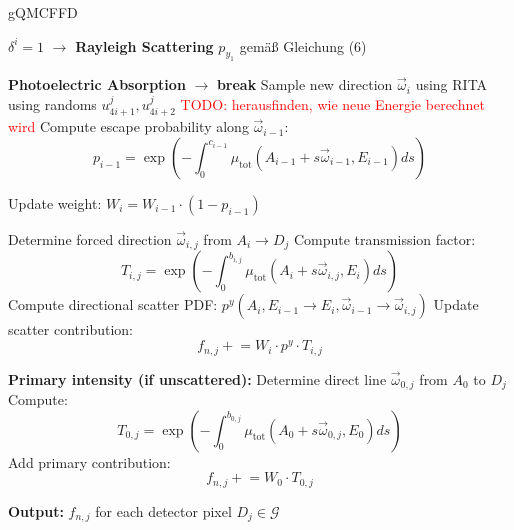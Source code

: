 \begin{algorithm}{gQMCFFD}
\begin{algorithmic}[1]
        
        \State $\delta^i=1$ $\to$ \textbf{Rayleigh Scattering} \State
        $p_{y_1}$ gemäß Gleichung (6)

        \Else 
            \State \textbf{Photoelectric Absorption} $\to$ \textbf{break}
    \EndIf
    \State Sample new direction $\vec{\omega}_i$ using RITA using randoms $u^j_{4i+1}, u^j_{4i+2}$
    \State \textcolor{red}{TODO: herausfinden, wie neue Energie berechnet wird}
    \State Compute escape probability along $\vec{\omega}_{i-1}$:
    $$p_{i-1} = \exp\left(-\int_0^{c_{i-1}} \mu_{\text{tot}}(A_{i-1} + s\vec{\omega}_{i-1}, E_{i-1}) ds\right)$$
    
    \State Update weight: $W_i = W_{i-1} \cdot (1 - p_{i-1})$

        \State Determine forced direction $\vec{\omega}_{i,j}$ from $A_i \to D_j$
        \State Compute transmission factor:
        \[
        T_{i,j} = \exp\left(-\int_0^{b_{i,j}} \mu_{\text{tot}}(A_i + s\vec{\omega}_{i,j}, E_i) ds\right)
        \]
        \State Compute directional scatter PDF: $p^y(A_i, E_{i-1} \rightarrow E_i, \vec{\omega}_{i-1} \rightarrow \vec{\omega}_{i,j})$
        \State Update scatter contribution:
        \[
        f_{n,j} \mathrel{+}= W_i \cdot p^y \cdot T_{i,j}
        \]
    \EndFor

\EndFor

\end{algorithmic}
\end{algorithm}

\begin{algorithm}
\caption{gQMCFFD: X-ray Scatter Simulation (Part 2)}
\begin{algorithmic}[1]

\vspace{.25cm}
\State \textbf{Primary intensity (if unscattered):}
    \State Determine direct line $\vec{\omega}_{0,j}$ from $A_0$ to $D_j$
    \State Compute:
    \[
    T_{0,j} = \exp\left(-\int_0^{b_{0,j}} \mu_{\text{tot}}(A_0 + s\vec{\omega}_{0,j}, E_0) ds\right)
    \]
    \State Add primary contribution:
    \[
    f_{n,j} \mathrel{+}= W_0 \cdot T_{0,j}
    \]
\EndFor

\State \textbf{Output:} $f_{n,j}$ for each detector pixel $D_j \in \mathcal{G}$

\end{algorithmic}
\end{algorithm}